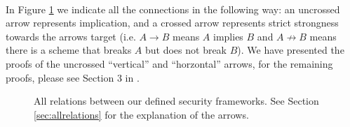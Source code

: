 \documentclass{article}
\theoremstyle{definition}
\begin{document}
\paragraph{} In Figure \ref{fig:secrelations} we indicate all the connections in the following way:
an uncrossed arrow represents implication, and a crossed arrow represents strict
strongness towards the arrows target (i.e. $A \rightarrow B$ means $A$ implies
$B$ and $A \not\rightarrow B$ means there is a scheme that breaks $A$ but does
not break $B$). We have presented the proofs of the uncrossed ``vertical'' and
``horzontal'' arrows, for the remaining proofs, please see Section 3 in \cite{bellaresecurityrelations}.
\begin{figure}
  \centering
  \caption{All relations between our defined security frameworks. See Section
    \ref{sec:allrelations} for the explanation of the arrows.}
  \label{fig:secrelations}
\end{figure}
\end{document}
